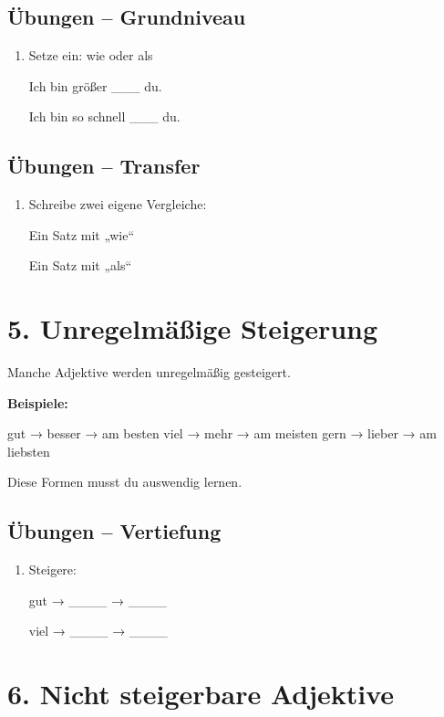 \documentclass[a4paper,12pt]{article}
\begin{document}
\subsection*{Übungen – Grundniveau}

\begin{enumerate}
\item Setze ein: wie oder als

Ich bin größer \_\_\_ du.

Ich bin so schnell \_\_\_ du.
\end{enumerate}

\subsection*{Übungen – Transfer}

\begin{enumerate}
\item Schreibe zwei eigene Vergleiche:

Ein Satz mit „wie“

Ein Satz mit „als“
\end{enumerate}

\section*{5. Unregelmäßige Steigerung}

Manche Adjektive werden unregelmäßig gesteigert.

\textbf{Beispiele:}

gut → besser → am besten  
viel → mehr → am meisten  
gern → lieber → am liebsten  

\begin{achtung}
Diese Formen musst du auswendig lernen.
\end{achtung}

\subsection*{Übungen – Vertiefung}

\begin{enumerate}
\item Steigere:

gut → \_\_\_\_ → \_\_\_\_

viel → \_\_\_\_ → \_\_\_\_
\end{enumerate}

\section*{6. Nicht steigerbare Adjektive}
\end{document}
